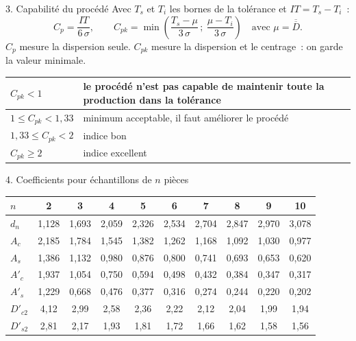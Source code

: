 \documentclass[a4paper,11pt]{article}
\newcommand{\Dbb}{\overline{\overline{D}}}
\begin{document}
\begin{rappel}{3. Capabilité du procédé}
\footnotesize
Avec $T_s$ et $T_i$ les bornes de la tolérance et $IT = T_s - T_i$~:
\[
C_p = \frac{IT}{6\,\sigma}, \qquad C_{pk} = \min\!\left(\frac{T_s - \mu}{3\,\sigma}\,;\ \frac{\mu - T_i}{3\,\sigma}\right) \quad\text{avec } \mu = \Dbb.
\]
$C_p$ mesure la dispersion seule. $C_{pk}$ mesure la dispersion et le centrage~: on garde la valeur minimale.

\smallskip
\begin{center}\small
\renewcommand{\arraystretch}{1.15}
\begin{tabular}{|l|l|}\hline
$C_{pk} < 1$ & le procédé n'est pas capable de maintenir toute la production dans la tolérance \\ \hline
$1 \leq C_{pk} < 1{,}33$ & minimum acceptable, il faut améliorer le procédé \\ \hline
$1{,}33 \leq C_{pk} < 2$ & indice bon \\ \hline
$C_{pk} \geq 2$ & indice excellent \\ \hline
\end{tabular}
\end{center}
\end{rappel}

\begin{rappel}{4. Coefficients pour échantillons de $n$ pièces}
\small
\begin{center}\small
\renewcommand{\arraystretch}{1.2}
\begin{tabular}{|l|*{9}{c|}}\hline
\rowcolor{white}
$n$ & 2 & 3 & 4 & 5 & 6 & 7 & 8 & 9 & 10 \\ \hline
$d_n$ & 1,128 & 1,693 & 2,059 & 2,326 & 2,534 & 2,704 & 2,847 & 2,970 & 3,078 \\ \hline
$A_c$ & 2,185 & 1,784 & 1,545 & 1,382 & 1,262 & 1,168 & 1,092 & 1,030 & 0,977 \\ \hline
$A_s$ & 1,386 & 1,132 & 0,980 & 0,876 & 0,800 & 0,741 & 0,693 & 0,653 & 0,620 \\ \hline
$A'_c$ & 1,937 & 1,054 & 0,750 & 0,594 & 0,498 & 0,432 & 0,384 & 0,347 & 0,317 \\ \hline
$A'_s$ & 1,229 & 0,668 & 0,476 & 0,377 & 0,316 & 0,274 & 0,244 & 0,220 & 0,202 \\ \hline
$D'_{c2}$ & 4,12 & 2,99 & 2,58 & 2,36 & 2,22 & 2,12 & 2,04 & 1,99 & 1,94 \\ \hline
$D'_{s2}$ & 2,81 & 2,17 & 1,93 & 1,81 & 1,72 & 1,66 & 1,62 & 1,58 & 1,56 \\ \hline
\end{tabular}
\end{center}
\end{rappel}
\end{document}
